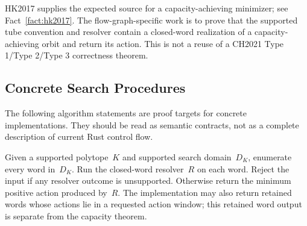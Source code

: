 \begin{remark}[Role of HK2017]\label{rem:flow-graph-hk2017-role}
HK2017 supplies the expected source for a capacity-achieving minimizer; see
Fact~\ref{fact:hk2017}.  The flow-graph-specific work
is to prove that the supported tube convention and resolver contain a
closed-word realization of a capacity-achieving orbit and return its action.
This is not a reuse of a CH2021 Type 1/Type 2/Type 3 correctness theorem.
\end{remark}

\subsection{Concrete Search Procedures}
\label{sec:flow-graph-concrete-searches}

The following algorithm statements are proof targets for concrete
implementations.  They should be read as semantic contracts, not as a complete
description of current Rust control flow.

\begin{unverified}
\begin{algorithm}%
\label{alg:flow-graph-enumerate-all-closed-words}
Given a supported polytope~$K$ and supported search domain~$D_K$, enumerate
every word in~$D_K$.  Run the closed-word resolver~$R$ on each word.
Reject the input if any resolver outcome is unsupported.  Otherwise return the
minimum positive action produced by~$R$.  The implementation may also return
retained words whose actions lie in a requested action window; this retained
word output is separate from the capacity theorem.
\end{algorithm}
\end{unverified}

